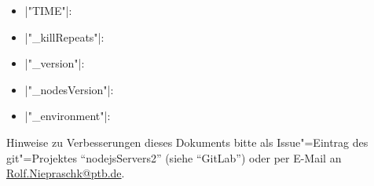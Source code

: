 \documentclass[%
fontsize=11pt
,paper=a4
,twoside
,headings=normal
,pagesize
]{scrartcl}
\begin{document}
\begin{description}
\begin{itemize}
    \item |"TIME"|: \par

    \item |"_killRepeats"|: \par

    \item |"_version"|: \par

    \item |"_nodesVersion"|: \par

    \item |"_environment"|: \par

  \end{itemize}

\end{description}

\vfill

\begingroup \small \itshape

\noindent Hinweise zu Verbesserungen dieses Dokuments bitte als
Issue"=Eintrag des git"=Projektes "`nodejsServers2"' (siehe "`GitLab"') oder per
E-Mail an \url{Rolf.Niepraschk@ptb.de}.

\endgroup
\end{document}
